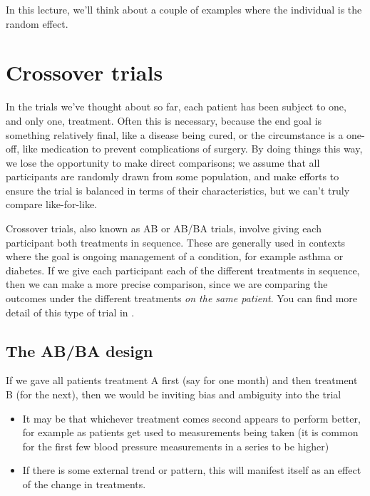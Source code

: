 \documentclass[
  openany]{book}
\providecommand{\tightlist}{%
  \setlength{\itemsep}{0pt}\setlength{\parskip}{0pt}}
\theoremstyle{definition}
\theoremstyle{definition}
\theoremstyle{definition}
\theoremstyle{definition}
\theoremstyle{remark}
\begin{document}
In this lecture, we'll think about a couple of examples where the individual is the random effect.

\section{Crossover trials}\label{crossover-trials}

In the trials we've thought about so far, each patient has been subject to one, and only one, treatment. Often this is necessary, because the end goal is something relatively final, like a disease being cured, or the circumstance is a one-off, like medication to prevent complications of surgery. By doing things this way, we lose the opportunity to make direct comparisons; we assume that all participants are randomly drawn from some population, and make efforts to ensure the trial is balanced in terms of their characteristics, but we can't truly compare like-for-like.

Crossover trials, also known as AB or AB/BA trials, involve giving each participant both treatments in sequence. These are generally used in contexts where the goal is ongoing management of a condition, for example asthma or diabetes. If we give each participant each of the different treatments in sequence, then we can make a more precise comparison, since we are comparing the outcomes under the different treatments \emph{on the same patient}. You can find more detail of this type of trial in \citet{armitage1982two}.

\subsection{The AB/BA design}\label{the-abba-design}

If we gave all patients treatment A first (say for one month) and then treatment B (for the next), then we would be inviting bias and ambiguity into the trial

\begin{itemize}
\tightlist
\item
  It may be that whichever treatment comes second appears to perform better, for example as patients get used to measurements being taken (it is common for the first few blood pressure measurements in a series to be higher)
\item
  If there is some external trend or pattern, this will manifest itself as an effect of the change in treatments.
\end{itemize}
\end{document}
